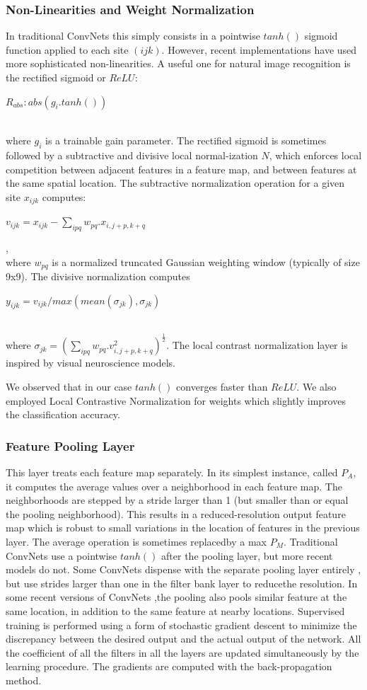 \documentclass[conference]{IEEEtran}
\begin{document}
\subsubsection{Non-Linearities and Weight Normalization}
In traditional ConvNets this simply consists in a pointwise $tanh()$ sigmoid function applied to each site $(ijk)$. However, recent implementations have used more sophisticated non-linearities. A useful one for natural image recognition is the rectified sigmoid or $ReLU$:\\ 
\centerline{$R_{abs} : abs(g_i.tanh())$} \\ 
where $g_i$ is a trainable gain parameter. The rectified sigmoid is sometimes followed by a subtractive and divisive local normal-ization $N$, which enforces local competition between adjacent features in a feature map, and between features at the same spatial location. The subtractive normalization operation for a given site $x_{ijk}$ computes:\\ 
\centerline{$v_{ijk} = x_{ijk} − \sum_{ipq} w_{pq}.x_{i, j+p, k+q}$},\\ 
where $w_{pq}$ is a normalized truncated Gaussian weighting window (typically of size 9x9). The divisive normalization computes\\ \centerline{$y_{ijk}=v_{ijk} / max(mean(\sigma_{jk}), \sigma_{jk})$}\\ 
where $\sigma_{jk}=(\sum_{ipq} w_{pq}.v_{i, j+p, k+q}^2)^\frac{1}{2}$. The local contrast normalization layer is inspired by visual neuroscience models.

We observed that in our case $tanh()$ converges faster than $ReLU$. We also employed Local Contrastive Normalization for weights which slightly improves the classification accuracy.

\subsubsection{Feature Pooling Layer}
This layer treats each feature map separately. In its simplest instance, called
$P_A$, it computes the average values over a neighborhood in each feature map.
The neighborhoods are stepped by a stride larger than 1 (but smaller than or equal the pooling neighborhood). This
results in a reduced-resolution output feature map which is robust to small variations in the location of features in the
previous layer. The average operation is sometimes replacedby a max $P_M$. Traditional ConvNets use a pointwise
$tanh()$ after the pooling layer, but more recent models do not. Some ConvNets dispense with the separate pooling layer entirely
, but use strides larger than one in the filter bank layer to reducethe resolution. In some recent versions of ConvNets
,the pooling also pools similar feature at the same location, in addition to the same feature at nearby locations.
Supervised training is performed using a form of stochastic gradient descent to minimize the discrepancy between the
desired output and the actual output of the network. All the coefficient of all the filters in all the layers are updated
simultaneously by the learning procedure. The gradients are computed with the back-propagation method.
\end{document}
